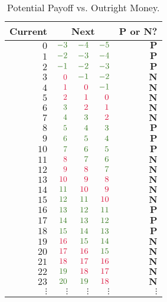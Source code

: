 \documentclass[11pt, reqno]{amsart}
\begin{document}
\begin{problem}[6]
  \begin{table}[h!]
    \centering
    \begin{tabular}{||r|r|r|r|r||}
    \bottomrule
      Current & \multicolumn{3}{|c|}{Next} & P or N? \\
    \midrule
      $0$ & $\green{-3}$ & $\green{-4}$ & $\green{-5}$ & $\mathbf{P}$ \\
      $1$ & $\green{-2}$ & $\green{-3}$ & $\green{-4}$ & $\mathbf{P}$ \\
      $2$ & $\green{-1}$ & $\green{-2}$ & $\green{-3}$ & $\mathbf{P}$ \\
      \midrule
      $3$ & $\crim{0}$ & $\green{-1}$ & $\green{-2}$ & $\mathbf{N}$ \\
      $4$ & $\crim{1}$ & $\crim{0}$ & $\green{-1}$ & $\mathbf{N}$ \\
      $5$ & $\crim{2}$ & $\crim{1}$ & $\crim{0}$ & $\mathbf{N}$ \\
      $6$ & $\green{3}$ & $\crim{2}$ & $\crim{1}$ & $\mathbf{N}$ \\
      $7$ & $\green{4}$ & $\green{3}$ & $\crim{2}$ & $\mathbf{N}$ \\
      \midrule
      $8$ & $\green{5}$ & $\green{4}$ & $\green{3}$ & $\mathbf{P}$ \\
      $9$ & $\green{6}$ & $\green{5}$ & $\green{4}$ & $\mathbf{P}$ \\
      $10$ & $\green{7}$ & $\green{6}$ & $\green{5}$ & $\mathbf{P}$ \\
      \midrule
      $11$ & $\crim{8}$ & $\green{7}$ & $\green{6}$ & $\mathbf{N}$ \\
      $12$ & $\crim{9}$ & $\crim{8}$ & $\green{7}$ & $\mathbf{N}$ \\
      $13$ & $\crim{10}$ & $\crim{9}$ & $\crim{8}$ & $\mathbf{N}$ \\
      $14$ & $\green{11}$ & $\crim{10}$ & $\crim{9}$ & $\mathbf{N}$ \\
      $15$ & $\green{12}$ & $\green{11}$ & $\crim{10}$ & $\mathbf{N}$ \\
      \midrule
      $16$ & $\green{13}$ & $\green{12}$ & $\green{11}$ & $\mathbf{P}$ \\
      $17$ & $\green{14}$ & $\green{13}$ & $\green{12}$ & $\mathbf{P}$ \\
      $18$ & $\green{15}$ & $\green{14}$ & $\green{13}$ & $\mathbf{P}$ \\
      \midrule
      $19$ & $\crim{16}$ & $\green{15}$ & $\green{14}$ & $\mathbf{N}$ \\
      $20$ & $\crim{17}$ & $\crim{16}$ & $\green{15}$ & $\mathbf{N}$ \\
      $21$ & $\crim{18}$ & $\crim{17}$ & $\crim{16}$ & $\mathbf{N}$ \\
      $22$ & $\green{19}$ & $\crim{18}$ & $\crim{17}$ & $\mathbf{N}$ \\
      $23$ & $\green{20}$ & $\green{19}$ & $\crim{18}$ & $\mathbf{N}$ \\
      \midrule
      $\vdots$ & $\vdots$ & $\vdots$ & $\vdots$ & $\vdots$ \\
    \end{tabular}
    \caption{Potential Payoff vs. Outright Money.}
  \end{table}
\end{problem}
\end{document}
